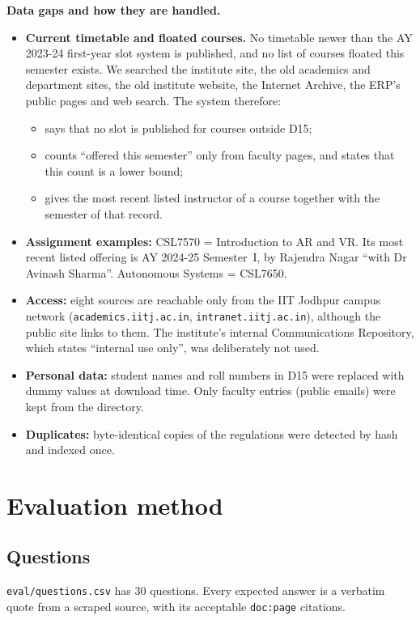 \documentclass[11pt,a4paper]{article}
\newcommand{\code}[1]{\texttt{#1}}
\begin{document}
\medskip
\noindent\textbf{Data gaps and how they are handled.}
\begin{itemize}
  \item \textbf{Current timetable and floated courses.} No timetable newer than the AY 2023-24 first-year slot system
        is published, and no list of courses floated this semester exists. We searched the institute site, the old
        academics and department sites, the old institute website, the Internet Archive, the ERP's public pages
        and web search. The system therefore:
    \begin{itemize}
      \item says that no slot is published for courses outside D15;
      \item counts ``offered this semester'' only from faculty pages, and states that this count is a lower bound;
      \item gives the most recent listed instructor of a course together with the semester of that record.
    \end{itemize}
  \item \textbf{Assignment examples:} CSL7570 = Introduction to AR and VR. Its most recent listed offering is
        AY 2024-25 Semester~I, by Rajendra Nagar ``with Dr Avinash Sharma''. Autonomous Systems = CSL7650.
  \item \textbf{Access:} eight sources are reachable only from the IIT Jodhpur campus network
        (\code{academics.iitj.ac.in}, \code{intranet.iitj.ac.in}), although the public site links to them. The
        institute's internal Communications Repository, which states ``internal use only'', was deliberately not used.
  \item \textbf{Personal data:} student names and roll numbers in D15 were replaced with dummy values at download
        time. Only faculty entries (public emails) were kept from the directory.
  \item \textbf{Duplicates:} byte-identical copies of the regulations were detected by hash and indexed once.
\end{itemize}

\section{Evaluation method}

\subsection{Questions}
\code{eval/questions.csv} has 30 questions. Every expected answer is a verbatim quote from a scraped source, with
its acceptable \code{doc:page} citations.
\end{document}
